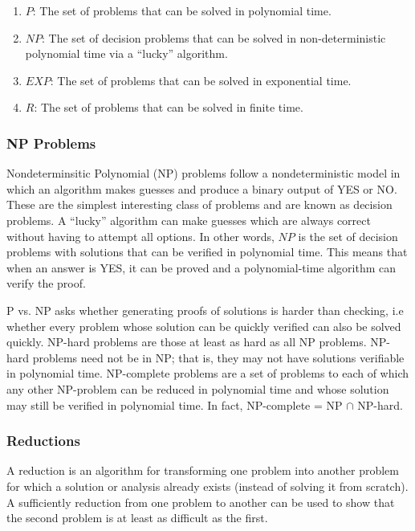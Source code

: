 \documentclass{article}
\begin{document}
    \begin{enumerate}
        \item $P$:  The set of problems that can be solved in polynomial time.
        \item $NP$:  The set of decision problems that can be solved in non-deterministic polynomial time via a ``lucky'' algorithm.
        \item $EXP$: The set of problems that can be solved in exponential time. 
        \item $R$: The set of problems that can be solved in finite time.
    \end{enumerate}
    
    \subsubsection{NP Problems}
    Nondeterminsitic Polynomial (NP) problems follow a nondeterministic model in which an algorithm makes guesses and produce a binary output of YES or NO. These are the simplest interesting class of problems and are known as decision problems. A ``lucky” algorithm can make guesses which are always correct without having to attempt all options. In other words, $NP$ is the set of decision problems with solutions that can be verified in polynomial time. This means that when an answer is YES, it can be proved and a polynomial-time algorithm can verify the proof.
    
    P vs. NP asks whether generating proofs of solutions is harder than checking, i.e whether every problem whose solution can be quickly verified can also be solved quickly. NP-hard problems are those at least as hard as all NP problems. NP-hard problems need not be in NP; that is, they may not have solutions verifiable in polynomial time. NP-complete problems are a set of problems to each of which any other NP-problem can be reduced in polynomial time and whose solution may still be verified in polynomial time. In fact, NP-complete = NP $\cap$ NP-hard.
    
    \subsubsection{Reductions}
    A reduction is an algorithm for transforming one problem into another problem for which a solution or analysis already exists (instead of solving it from scratch). A sufficiently reduction from one problem to another can be used to show that the second problem is at least as difficult as the first. 
    
\end{document}
